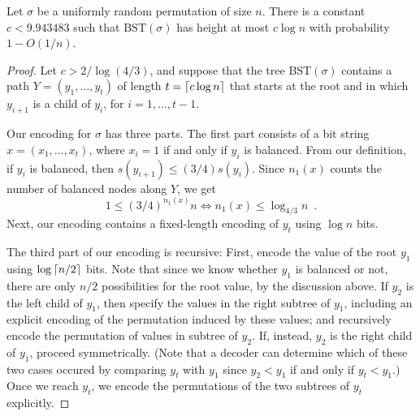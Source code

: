 \documentclass{patmorin}
\newcommand{\aremark}[3]{\textcolor{blue}{\textsc{#1 #2:}}
  \textcolor{red}{\textsf{#3}}}
\newcommand{\wolfgang}[2][says]{\aremark{Wolfgang}{#1}{#2}}
\begin{document}
\begin{thm}
  Let $\sigma$ be a uniformly random permutation of size $n$. 
  There is a constant $c < 9.943483$ such that 
  $\text{BST}(\sigma)$ has height at most $c\log n$ with probability
  $1 - O(1/n)$.
\end{thm}
\begin{proof}
  Let $c > 2/\log (4/3)$,
  and suppose that the tree $\text{BST}(\sigma)$ contains a path
  $Y = (y_1, \ldots, y_t)$ of length $t = {\lceil c \log n \rceil}$ that
  starts at the root and in which $y_{i+1}$ is a child of $y_i$,
  for $i = 1, \dots, t-1$.

  Our encoding for $\sigma$ has three parts. 
  The first part consists of
  a bit string
  $x = (x_1, \dots, x_t)$, where $x_i = 1$ if and only if $y_i$ is
  balanced. From our definition, if $y_i$ is balanced, then
  $s(y_{i + 1}) \leq (3/4) s(y_i)$. Since $n_1(x)$ counts the
  number of balanced nodes along $Y$, we get
  \[
    1 \leq (3/4)^{n_1(x)} n \iff n_1(x) \leq \log_{4/3} n \enspace .
  \]
  Next, our encoding contains a fixed-length encoding of $y_t$ using
  $\log n$ bits.

  The third part of our encoding is recursive: First, encode the value of
  the root $y_1$ using $\log {\lceil n/2 \rceil}$ bits. Note that since we know
  whether $y_1$ is balanced or not, there are only $n/2$ possibilities
  for the root value, by the discussion above.  If $y_2$ is the left child
  of $y_1$, then specify the values in the right subtree of $y_1$, 
  including
  an explicit encoding of the permutation induced by these values; and
  recursively encode the permutation of values in subtree of $y_2$. If,
  instead, $y_2$ is the right child of  $y_1$, proceed symmetrically.
  (Note that a decoder can determine which of these two cases occured by
  comparing $y_t$ with $y_1$ since $y_2 <y_1$ if and only if $y_t< y_1$.)
  Once we reach $y_t$, we encode the permutations of the two subtrees
  of $y_t$ explicitly.
 

\end{proof}
\end{document}
